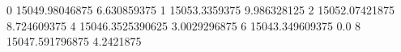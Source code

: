0 15049.98046875 6.630859375
1 15053.3359375 9.986328125
2 15052.07421875 8.724609375
4 15046.3525390625 3.0029296875
6 15043.349609375 0.0
8 15047.591796875 4.2421875
